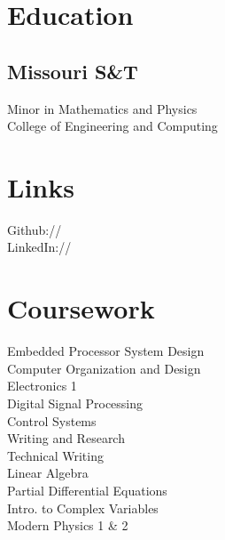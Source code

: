 \documentclass[]{deedy-resume-openfont}
\begin{document}
%
%

%
%



%
%

\begin{minipage}[t]{0.33\textwidth} 


\section{Education} 

\subsection{Missouri S\&T}
Minor in Mathematics and Physics \\
College of Engineering and Computing \\
\sectionsep


\section{Links} 
Github:// \href{https://github.com/andrewvh4}{} \\
LinkedIn://  \href{https://www.linkedin.com/in/andrewvanhorn/}{} \\
\sectionsep


\section{Coursework}
Embedded Processor System Design\\
Computer Organization and Design\\
Electronics 1\\
Digital Signal Processing\\
Control Systems\\
Writing and Research\\
Technical Writing\\
Linear Algebra\\
Partial Differential Equations\\
Intro. to Complex Variables\\
Modern Physics 1 \& 2


\end{minipage}
\end{document}
